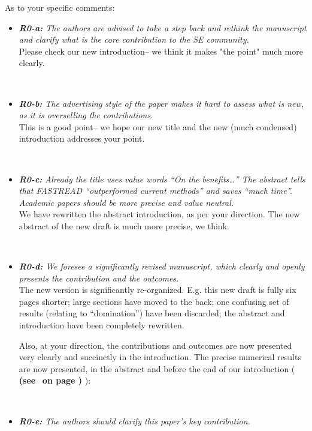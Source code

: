 \documentclass{svjour3}
\theoremstyle{break}
\newcommand{\review}[1]{{\textit{#1}}~\\}
\newcommand{\citeresp}[1]{
{\bf (see } \fcolorbox{black}{black!15}{
 \bf
  \scriptsize R-{#1}}~{\bf{on page \pageref{response:#1})}}
}
\begin{document}
\noindent
\newpage
As to your specific comments:
\begin{itemize}
\item
\review{\textbf{R0-a:} The authors are advised to take a step back and rethink the manuscript and clarify what is the core contribution to the SE community.}

Please check our new introduction-- we think it makes "the point" much more clearly.
\par~

\item
\review{\textbf{R0-b:} The advertising style of the paper makes it hard to assess what is new, as it is overselling the contributions.}

This is a good point-- we hope our new title and  the new (much condensed)   introduction addresses your point.
\par~

\item
\review{\textbf{R0-c:} Already the title uses value words “On the benefits…” The abstract tells that FASTREAD “outperformed current methods” and saves “much time”. Academic papers should be more precise and value neutral.}

We have rewritten the  abstract introduction, as per your direction. The new abstract of the new draft is much more precise, we think.

\par~

\item
\review{\textbf{R0-d:} We foresee a significantly revised manuscript, which clearly and openly presents the contribution and the outcomes.}

The new version is significantly re-organized.  E.g. this new draft is fully six pages shorter; large sections have moved to the back; one confusing set of results (relating to “domination”) have been discarded; the abstract and introduction have been completely rewritten. 

Also, at your direction, the contributions and outcomes are now presented very clearly and succinctly in the introduction. The precise numerical results are now presented, in the abstract and  before the end of our introduction (\citeresp{0d}):
\par~

\item
\review{\textbf{R0-e:} The authors should clarify this paper’s key contribution.}


\end{itemize}
\end{document}
